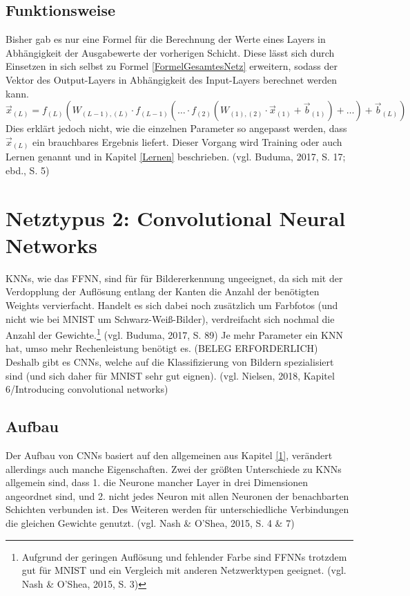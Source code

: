 \documentclass[a4paper,12pt,ngerman,oneside]{scrreprt}	%
\newcommand{\fundamentals}[1]{(vgl. Buduma, 2017, S. {#1})}
\newcommand{\cnnKlein}[1]{(vgl. Nash \& O'Shea, 2015, S. {#1})}
\begin{document}
		\section{Funktionsweise}
		Bisher gab es nur eine Formel für die Berechnung der Werte eines Layers in Abhängigkeit der Ausgabewerte der vorherigen Schicht. Diese lässt sich durch Einsetzen in sich selbst zu Formel \ref{FormelGesamtesNetz} erweitern, sodass der Vektor des Output-Layers in Abhängigkeit des Input-Layers berechnet werden kann. 
			\begin{equation}\label{FormelGesamtesNetz}
				\vec{x}_{(L)} = f_{(L)} \left( W_{(L-1),(L)} \cdot f_{(L-1)} \left(…\cdot f_{(2)} \left(W_{(1),(2)}\cdot\vec{x}_{(1)}+\vec{b}_{(1)}\right)+…\right)+\vec{b}_{(L)}\right)
			\end{equation}
		Dies erklärt jedoch nicht, wie die einzelnen Parameter so angepasst werden, dass $\vec{x}_{(L)}$ ein brauchbares Ergebnis liefert. Dieser Vorgang wird Training oder auch Lernen genannt und in Kapitel \ref{Lernen} beschrieben. \fundamentals{17; ebd., S. 5}
	
	\chapter{Netztypus 2: Convolutional Neural Networks}
	KNNs, wie das FFNN, sind für für Bildererkennung ungeeignet, da sich mit der Verdopplung der Auflösung entlang der Kanten die Anzahl der benötigten Weights vervierfacht. Handelt es sich dabei noch zusätzlich um Farbfotos (und nicht wie bei MNIST um Schwarz-Weiß-Bilder), verdreifacht sich nochmal die Anzahl der Gewichte.\footnote{Aufgrund der geringen Auflösung und fehlender Farbe sind FFNNs trotzdem gut für MNIST und ein Vergleich mit anderen Netzwerktypen geeignet. \cnnKlein{3}} \fundamentals{89} Je mehr Parameter ein KNN hat, umso mehr Rechenleistung benötigt es. (BELEG ERFORDERLICH) Deshalb gibt es CNNs, welche auf die Klassifizierung von Bildern spezialisiert sind (und sich daher für MNIST sehr gut eignen). (vgl. Nielsen, 2018, Kapitel 6/Introducing convolutional networks)
	
	
		\section{Aufbau}
		Der Aufbau von CNNs basiert auf den allgemeinen aus Kapitel \ref{1}, verändert allerdings auch manche Eigenschaften. Zwei der größten Unterschiede zu KNNs allgemein sind, dass 1. die Neurone mancher Layer in drei Dimensionen angeordnet sind, und 2. nicht jedes Neuron mit allen Neuronen der benachbarten Schichten verbunden ist. Des Weiteren werden für unterschiedliche Verbindungen die gleichen Gewichte genutzt. \cnnKlein{4 \& 7}
			
\end{document}
